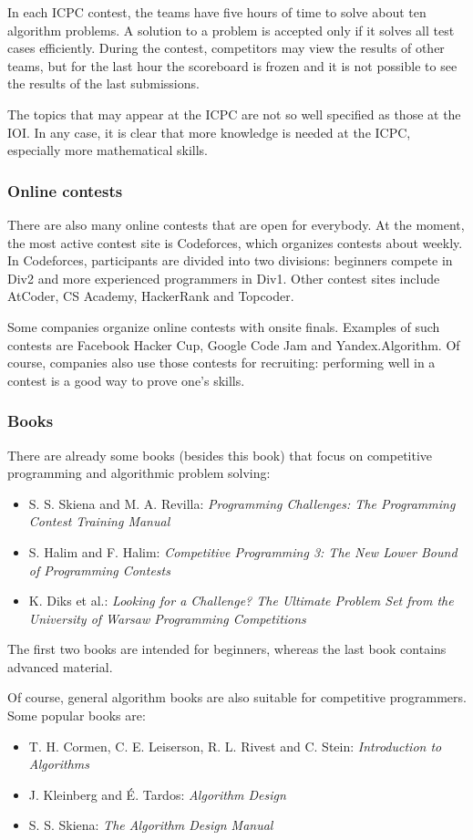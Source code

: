 In each ICPC contest, the teams have five hours of time to
solve about ten algorithm problems.
A solution to a problem is accepted only if it solves
all test cases efficiently.
During the contest, competitors may view the results of other teams,
but for the last hour the scoreboard is frozen and it
is not possible to see the results of the last submissions.

The topics that may appear at the ICPC are not so well
specified as those at the IOI.
In any case, it is clear that more knowledge is needed
at the ICPC, especially more mathematical skills.

\subsubsection{Online contests}

There are also many online contests that are open for everybody.
At the moment, the most active contest site is Codeforces,
which organizes contests about weekly.
In Codeforces, participants are divided into two divisions:
beginners compete in Div2 and more experienced programmers in Div1.
Other contest sites include AtCoder, CS Academy, HackerRank and Topcoder.

Some companies organize online contests with onsite finals.
Examples of such contests are Facebook Hacker Cup,
Google Code Jam and Yandex.Algorithm.
Of course, companies also use those contests for recruiting:
performing well in a contest is a good way to prove one's skills.

\subsubsection{Books}

There are already some books (besides this book) that
focus on competitive programming and algorithmic problem solving:

\begin{itemize}
\item S. S. Skiena and M. A. Revilla:
\emph{Programming Challenges: The Programming Contest Training Manual} \cite{ski03}
\item S. Halim and F. Halim:
\emph{Competitive Programming 3: The New Lower Bound of Programming Contests} \cite{hal13}
\item K. Diks et al.: \emph{Looking for a Challenge? The Ultimate Problem Set from
the University of Warsaw Programming Competitions} \cite{dik12}
\end{itemize}

The first two books are intended for beginners,
whereas the last book contains advanced material.

Of course, general algorithm books are also suitable for
competitive programmers.
Some popular books are:

\begin{itemize}
\item T. H. Cormen, C. E. Leiserson, R. L. Rivest and C. Stein:
\emph{Introduction to Algorithms} \cite{cor09}
\item J. Kleinberg and É. Tardos:
\emph{Algorithm Design} \cite{kle05}
\item S. S. Skiena:
\emph{The Algorithm Design Manual} \cite{ski08}
\end{itemize}
